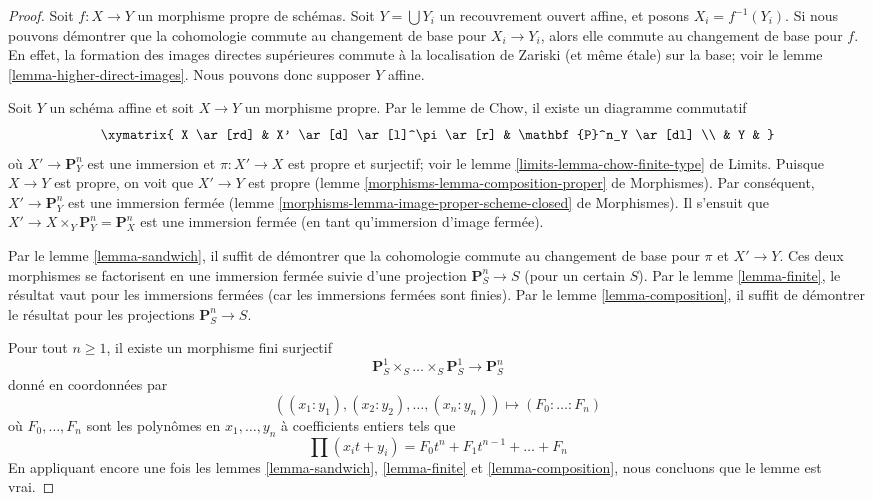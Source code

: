 \begin{proof}
Soit $f : X \to Y$ un morphisme propre de schémas.
Soit $Y = \bigcup Y_i$ un recouvrement ouvert affine,
et posons $X_i = f^{-1}(Y_i)$. Si nous pouvons démontrer
que la cohomologie commute au changement de base pour $X_i \to Y_i$,
alors elle commute au changement de base pour $f$.
En effet, la formation des images directes supérieures
commute à la localisation de Zariski (et même \'etale)
sur la base; voir le
lemme \ref{lemma-higher-direct-images}.
Nous pouvons donc supposer $Y$ affine.

\medskip\noindent
Soit $Y$ un schéma affine et soit $X \to Y$ un morphisme propre.
Par le lemme de Chow, il existe un diagramme commutatif
$$
\xymatrix{
X \ar[rd] & X' \ar[d] \ar[l]^\pi \ar[r] & \mathbf{P}^n_Y \ar[dl] \\
& Y &
}
$$
où $X' \to \mathbf{P}^n_Y$ est une immersion et
$\pi : X' \to X$ est propre et surjectif; voir le
lemme \ref{limits-lemma-chow-finite-type} de Limits.
Puisque $X \to Y$ est propre, on voit que $X' \to Y$ est propre
(lemme \ref{morphisms-lemma-composition-proper} de Morphismes).
Par conséquent, $X' \to \mathbf{P}^n_Y$ est une immersion fermée
(lemme \ref{morphisms-lemma-image-proper-scheme-closed} de Morphismes).
Il s'ensuit que $X' \to X \times_Y \mathbf{P}^n_Y = \mathbf{P}^n_X$
est une immersion fermée (en tant qu'immersion d'image fermée).

\medskip\noindent
Par le lemme \ref{lemma-sandwich},
il suffit de démontrer que la cohomologie commute au changement de base pour
$\pi$ et $X' \to Y$. Ces deux morphismes se factorisent en une immersion
fermée suivie d'une projection $\mathbf{P}^n_S \to S$ (pour un certain $S$).
Par le lemme \ref{lemma-finite}, le résultat vaut pour les immersions
fermées (car les immersions fermées sont finies).
Par le lemme \ref{lemma-composition}, il suffit de démontrer le
résultat pour les projections $\mathbf{P}^n_S \to S$.

\medskip\noindent
Pour tout $n \geq 1$, il existe un morphisme fini surjectif
$$
\mathbf{P}^1_S \times_S \ldots \times_S \mathbf{P}^1_S
\longrightarrow
\mathbf{P}^n_S
$$
donné en coordonnées par
$$
((x_1 : y_1), (x_2 : y_2), \ldots, (x_n : y_n))
\longmapsto
(F_0 : \ldots : F_n)
$$
où $F_0, \ldots, F_n$ sont les polynômes en $x_1, \ldots, y_n$
à coefficients entiers tels que
$$
\prod (x_i t + y_i) = F_0 t^n + F_1 t^{n - 1} + \ldots + F_n
$$
En appliquant encore une fois
les lemmes \ref{lemma-sandwich}, \ref{lemma-finite} et \ref{lemma-composition},
nous concluons que le lemme est vrai.
\end{proof}

